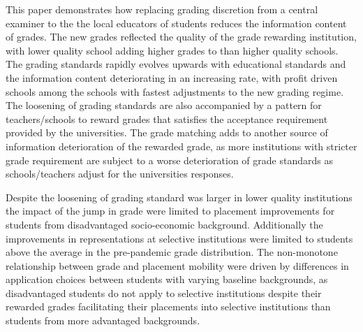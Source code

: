 

This paper demonstrates how replacing grading discretion from a central examiner to the the local educators of students reduces the information content of grades. The new grades reflected the quality of the grade rewarding institution, with lower quality school adding higher grades to than higher quality schools. The grading standards rapidly evolves upwards with educational standards and the information content deteriorating in an increasing rate, with profit driven schools among the schools with fastest adjustments to the new grading regime. The loosening of grading standards are also accompanied by a pattern for teachers/schools to reward grades that satisfies the acceptance requirement provided by the universities. The grade matching adds to another source of information deterioration of the rewarded grade, as more institutions with stricter grade requirement are subject to a worse deterioration of grade standards as schools/teachers adjust for the universities responses. 

Despite the loosening of grading standard was larger in lower quality institutions the impact of the jump in grade were limited to placement improvements for students from disadvantaged socio-economic background. Additionally the improvements in representations at selective institutions were limited to students above the average in the pre-pandemic grade distribution. The non-monotone relationship between grade and placement mobility were driven by differences in application choices between students with varying baseline backgrounds, as disadvantaged students do not apply to selective institutions despite their rewarded grades facilitating their placements into selective institutions than students from more advantaged backgrounds. 

